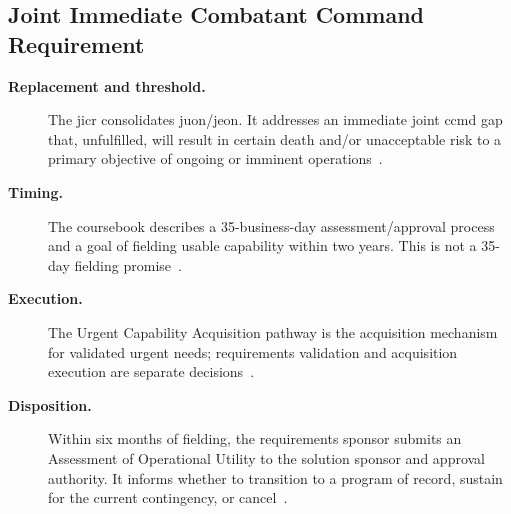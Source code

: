 \documentclass[../main.tex]{subfiles}
\begin{document}
\subsection{Joint Immediate Combatant Command Requirement}
\begin{description}
  \item[\textbf{Replacement and threshold.}] The \ac{jicr} consolidates \ac{juon}/\ac{jeon}. It addresses an immediate joint \ac{ccmd} gap that, unfulfilled, will result in certain death and/or unacceptable risk to a primary objective of ongoing or imminent operations~\autocite[slide 10]{edo-3-3-3-jfrp-2026}.
  \item[\textbf{Timing.}] The coursebook describes a 35-business-day assessment/approval process and a goal of fielding usable capability within two years. This is not a 35-day fielding promise~\autocite[slide 10]{edo-3-3-3-jfrp-2026}.
  \item[\textbf{Execution.}] The Urgent Capability Acquisition pathway is the acquisition mechanism for validated urgent needs; requirements validation and acquisition execution are separate decisions~\autocite{edo-3-3-2-acq-milestones-phases-2025}.
  \item[\textbf{Disposition.}] Within six months of fielding, the requirements sponsor submits an Assessment of Operational Utility to the solution sponsor and approval authority. It informs whether to transition to a program of record, sustain for the current contingency, or cancel~\autocite{edo-3-3-2-acq-milestones-phases-2025}.
\end{description}
\end{document}
